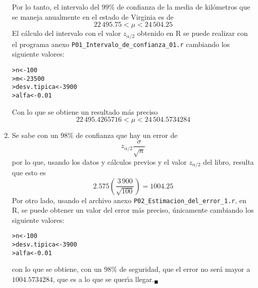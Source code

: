\begin{solucion}
\begin{enumerate}
\begin{equation*}
  \end{equation*}
  Por lo tanto, el intervalo del $99\%$ de confianza de la media de kil\'ometros que se maneja anualmente en el estado de Virginia es de
  \begin{equation*}
   22\,495.75 < \mu < 24\,504.25
  \end{equation*}
  El c\'alculo del intervalo con el valor $z_{\alpha/2}$ obtenido en R se puede realizar con el programa anexo \texttt{P01\_Intervalo\_de\_confianza\_01.r} cambiando los siguiente valores:
  \begin{verbatim}
>n<-100
>m<-23500
>desv.tipica<-3900
>alfa<-0.01
  \end{verbatim}
  \vspace{-0.5cm}
  Con lo que se obtiene un resultado m\'as preciso
  \begin{equation*}
   22\,495.4265716 < \mu < 24\,504.5734284
  \end{equation*}

  \item Se sabe con un $98\%$ de confianza que hay un error de
  \begin{equation*}
   z_{\alpha/2}\frac{\sigma}{\sqrt{n}}
  \end{equation*}
  por lo que, usando los datos y c\'alculos previos y el valor $z_{\alpha/2}$ del libro, resulta que esto es
  \begin{equation*}
   2.575\left( \frac{3\,900}{\sqrt{100}} \right) = 1004.25
  \end{equation*}
  Por otro lado, usando el archivo anexo \texttt{P02\_Estimacion\_del\_error\_1.r}, en R, se puede obtener un valor del error m\'as preciso, \'unicamente cambiando los siguiente valores:
  \begin{verbatim}
>n<-100
>desv.tipica<-3900
>alfa<-0.01
  \end{verbatim}
  \vspace{-0.5cm}
  con lo que se obtiene, con un $98\%$ de seguridad, que el error no ser\'a mayor a $1004.5734284$, que es a lo que se quer\'{\i}a llegar.${}_{\blacksquare}$

 \end{enumerate}

\end{solucion}

